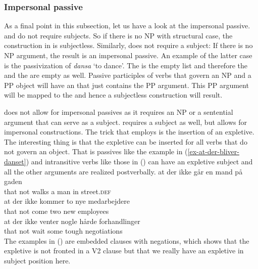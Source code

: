 \subsubsection{Impersonal passive}
\label{sec-impersonals}

As a final point in this subsection, let us have a look at the impersonal passive.  and
 do not require subjects. So if there is no NP with structural case, the construction in
 is subjectless. Similarly,  does not require a subject: If there is no NP argument,
the result is an impersonal passive. An example of the latter case is the passivization of
\emph{dansa} `to dance'. The \argstl is the empty list and therefore the \sprl and the \compsl are
empty as well. Passive participles of verbs that govern an NP and a PP object will have an \argstl
that just contains the PP argument. This PP argument will be mapped to the \compsl and hence a
subjectless construction will result.


 does not allow for impersonal passives as it requires an NP or a sentential argument that
can serve as a subject.  requires a subject as well, but allows for impersonal
constructions. The trick that  employs is the insertion of an
expletive. The interesting thing is that the expletive can be inserted for all
verbs that do not govern an object. That is passives like the example in (\ref{ex-at-der-bliver-danset}) and intransitive
verbs like those in () can have an expletive subject and all the other arguments are realized
postverbally.
\eal
\ex 
\gll at    der    ikke går   en mand på gaden\\
     that \expl{} not  walks a  man  in street.\textsc{def}\\\danish
\ex 
\gll at   der     ikke kommer to  nye medarbejdere\\
     that \expl{} not  come   two new employees\\
\ex
\gll at   der     ikke venter nogle hårde forhandlinger\\
     that \expl{} not  wait   some  tough negotiations\\
\zl
The examples in () are embedded clauses with negations, which shows that the expletive is not
fronted in a V2 clause but that we really have an expletive in subject position here.



